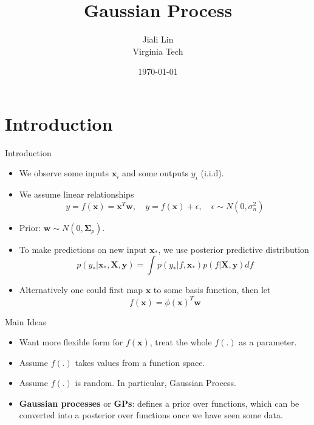 \documentclass[10pt,mathserif]{beamer}
\title{\large \bfseries Gaussian Process}
\author{Jiali Lin\\[3ex]
Virginia Tech}
\date{\today}
\begin{document}
\frame{
\thispagestyle{empty}
\titlepage
}

\section{Introduction}
\begin{frame}{Introduction}
\begin{itemize}
    \item We observe some inputs $\bm{x}_i$ and some outputs $y_i$ (i.i.d).  
    \item We assume linear relationships
    \begin{equation*}
        y = f(\bm{x}) = \bm{x}^T \bm{w},  \quad y = f(\bm{x}) + \epsilon, \quad \epsilon \sim N(0, \sigma_n^2)
    \end{equation*}
    \item Prior: $\bm{w} \sim N (0, \bm{\Sigma}_p)$.
    \item To make predictions on new input $\bm{x}_*$, we use posterior predictive distribution
    \begin{equation*}
        p(y_*|\bm{x}_*, \bm{X}, \bm{y}) = \int p(y_*|f, \bm{x}_*)p(f|\bm{X}, \bm{y})df
    \end{equation*}
    \item Alternatively one could first map $\bm{x}$ to some basis function, then let
    \begin{equation*}
        f(\bm{x}) = \phi(\bm{x})^T \bm{w}
    \end{equation*}
\end{itemize}
\end{frame}

\begin{frame}{Main Ideas}
\begin{itemize}
    \item Want more flexible form for $f(\bm{x})$, treat the whole $f(.)$ as a parameter. 
    \item Assume $f(.)$ takes values from a function space. 
    \item Assume $f(.)$ is random. In particular, Gaussian Process.
    \item \textbf{Gaussian processes} or \textbf{GPs}: defines a prior over functions, which can be converted into a posterior over functions once we have seen some data.
\end{itemize}    
\end{frame}
\end{document}
